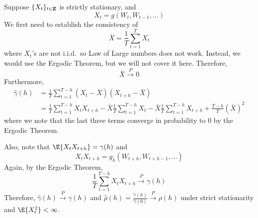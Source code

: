 Suppose $ \{X_t\}_{t\in\mathbf{Z}} $ is strictly stationary, and
\[ X_t=g(W_t,W_{t-1},\ldots) \]
We first need to establish the consistency of
\[ \bar{X}=\frac{1}{T} \sum_{t=1}^{T} X_t \]
where $ X_t $'s are not i.i.d.\ so Law of Large numbers
does not work. Instead, we would use the Ergodic Theorem, but
we will not cover it here. Therefore,
\[ \bar{X}\stackrel{P}{\to}0 \]
Furthermore,
\begin{align*}
    \hat{\gamma}(h)
     & =\frac{1}{T} \sum_{t=1}^{T-h} (X_t-\bar{X})(X_{t+h}-\bar{X}) \\
     & =\frac{1}{T} \sum_{t=1}^{T-h} X_t X_{t+h}-
    \bar{X}\frac{1}{T} \sum_{t=1}^{T-h} X_t -\bar{X}\frac{1}{T} \sum_{t=1}^{T-h} X_{t+h}+
    \frac{T-h}{T} (\bar{X})^2
\end{align*}
where we note that the last three terms converge in probability to 0 by the Ergodic Theorem.

Also, note that $ \E{X_t X_{t+h}}=\gamma(h) $ and
\[ X_{t}X_{t+h}=g_h(W_{t+h},W_{t+h-1},\ldots) \]
Again, by the Ergodic Theorem,
\[ \frac{1}{T} \sum_{t=1}^{T-h} X_t X_{t+h}\stackrel{P}{\to}\gamma(h) \]
Therefore, $ \hat{\gamma}(h)\stackrel{P}{\to}\gamma(h) $
and $ \displaystyle \hat{\rho}(h)=\frac{\hat{\gamma}(h)}{\hat{\gamma}(0)}\stackrel{P}{\to}\rho(h) $
under strict stationarity and $ \E{X_t^2}<\infty $.

